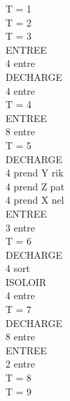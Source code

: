 \documentclass[12pt]{article} %
\begin{document}
\begin{multicols}{3}
{			\noindent T = 1\\
			T = 2\\
			T = 3\\
			\hspace*{5mm} ENTREE\\
			\hspace*{12mm} 4 entre\\
			\hspace*{5mm} DECHARGE\\
			\hspace*{12mm} 4 entre\\
			T = 4\\
			\hspace*{5mm} ENTREE\\
			\hspace*{12mm} 8 entre\\
			T = 5\\
			\hspace*{5mm} DECHARGE\\
			\hspace*{12mm} 4 prend Y rik\\
			\hspace*{12mm} 4 prend Z pat\\
			\hspace*{12mm} 4 prend X nel\\
			\hspace*{5mm} ENTREE\\
			\hspace*{12mm} 3 entre\\
			T = 6\\
			\hspace*{5mm} DECHARGE\\
			\hspace*{12mm} 4 sort\\
			\hspace*{5mm} ISOLOIR\\
			\hspace*{12mm} 4 entre\\
			T = 7\\
			\hspace*{5mm} DECHARGE\\
			\hspace*{12mm} 8 entre\\
			\hspace*{5mm} ENTREE\\
			\hspace*{12mm} 2 entre\\
			T = 8\\
			T = 9\\
}
\end{multicols}
\end{document}
